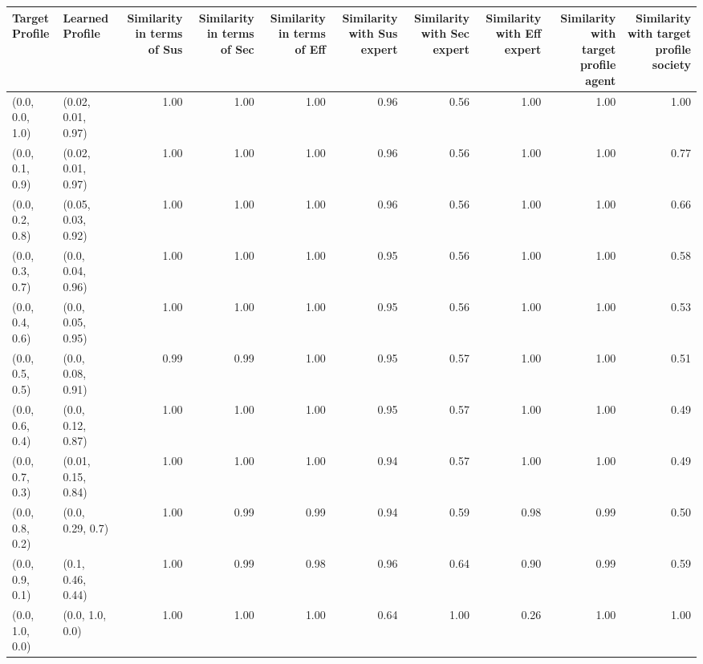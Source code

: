 \begin{tabular}{llrrrrrrrr}
\toprule
Target Profile & Learned Profile & Similarity in terms of Sus & Similarity in terms of Sec & Similarity in terms of Eff & Similarity with Sus expert & Similarity with Sec expert & Similarity with Eff expert & Similarity with target profile agent & Similarity with target profile society \\
\midrule
(0.0, 0.0, 1.0) & (0.02, 0.01, 0.97) & 1.00 & 1.00 & 1.00 & 0.96 & 0.56 & 1.00 & 1.00 & 1.00 \\
(0.0, 0.1, 0.9) & (0.02, 0.01, 0.97) & 1.00 & 1.00 & 1.00 & 0.96 & 0.56 & 1.00 & 1.00 & 0.77 \\
(0.0, 0.2, 0.8) & (0.05, 0.03, 0.92) & 1.00 & 1.00 & 1.00 & 0.96 & 0.56 & 1.00 & 1.00 & 0.66 \\
(0.0, 0.3, 0.7) & (0.0, 0.04, 0.96) & 1.00 & 1.00 & 1.00 & 0.95 & 0.56 & 1.00 & 1.00 & 0.58 \\
(0.0, 0.4, 0.6) & (0.0, 0.05, 0.95) & 1.00 & 1.00 & 1.00 & 0.95 & 0.56 & 1.00 & 1.00 & 0.53 \\
(0.0, 0.5, 0.5) & (0.0, 0.08, 0.91) & 0.99 & 0.99 & 1.00 & 0.95 & 0.57 & 1.00 & 1.00 & 0.51 \\
(0.0, 0.6, 0.4) & (0.0, 0.12, 0.87) & 1.00 & 1.00 & 1.00 & 0.95 & 0.57 & 1.00 & 1.00 & 0.49 \\
(0.0, 0.7, 0.3) & (0.01, 0.15, 0.84) & 1.00 & 1.00 & 1.00 & 0.94 & 0.57 & 1.00 & 1.00 & 0.49 \\
(0.0, 0.8, 0.2) & (0.0, 0.29, 0.7) & 1.00 & 0.99 & 0.99 & 0.94 & 0.59 & 0.98 & 0.99 & 0.50 \\
(0.0, 0.9, 0.1) & (0.1, 0.46, 0.44) & 1.00 & 0.99 & 0.98 & 0.96 & 0.64 & 0.90 & 0.99 & 0.59 \\
(0.0, 1.0, 0.0) & (0.0, 1.0, 0.0) & 1.00 & 1.00 & 1.00 & 0.64 & 1.00 & 0.26 & 1.00 & 1.00 \\
\bottomrule
\end{tabular}
